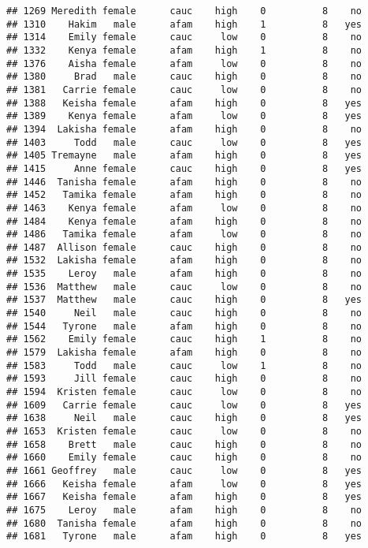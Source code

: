 \documentclass[
]{article}
\begin{document}
\begin{verbatim}
## 1269 Meredith female      cauc    high    0          8    no
## 1310    Hakim   male      afam    high    1          8   yes
## 1314    Emily female      cauc     low    0          8    no
## 1332    Kenya female      afam    high    1          8    no
## 1376    Aisha female      afam     low    0          8    no
## 1380     Brad   male      cauc    high    0          8    no
## 1381   Carrie female      cauc     low    0          8    no
## 1388   Keisha female      afam    high    0          8   yes
## 1389    Kenya female      afam     low    0          8   yes
## 1394  Lakisha female      afam    high    0          8    no
## 1403     Todd   male      cauc     low    0          8   yes
## 1405 Tremayne   male      afam    high    0          8   yes
## 1415     Anne female      cauc    high    0          8   yes
## 1446  Tanisha female      afam    high    0          8    no
## 1452   Tamika female      afam    high    0          8    no
## 1463    Kenya female      afam     low    0          8    no
## 1484    Kenya female      afam    high    0          8    no
## 1486   Tamika female      afam     low    0          8    no
## 1487  Allison female      cauc    high    0          8    no
## 1532  Lakisha female      afam    high    0          8    no
## 1535    Leroy   male      afam    high    0          8    no
## 1536  Matthew   male      cauc     low    0          8    no
## 1537  Matthew   male      cauc    high    0          8   yes
## 1540     Neil   male      cauc    high    0          8    no
## 1544   Tyrone   male      afam    high    0          8    no
## 1562    Emily female      cauc    high    1          8    no
## 1579  Lakisha female      afam    high    0          8    no
## 1583     Todd   male      cauc     low    1          8    no
## 1593     Jill female      cauc    high    0          8    no
## 1594  Kristen female      cauc     low    0          8    no
## 1609   Carrie female      cauc     low    0          8   yes
## 1638     Neil   male      cauc    high    0          8   yes
## 1653  Kristen female      cauc     low    0          8    no
## 1658    Brett   male      cauc    high    0          8    no
## 1660    Emily female      cauc    high    0          8    no
## 1661 Geoffrey   male      cauc     low    0          8   yes
## 1666   Keisha female      afam     low    0          8   yes
## 1667   Keisha female      afam    high    0          8   yes
## 1675    Leroy   male      afam    high    0          8    no
## 1680  Tanisha female      afam    high    0          8    no
## 1681   Tyrone   male      afam    high    0          8   yes

\end{verbatim}
\end{document}
